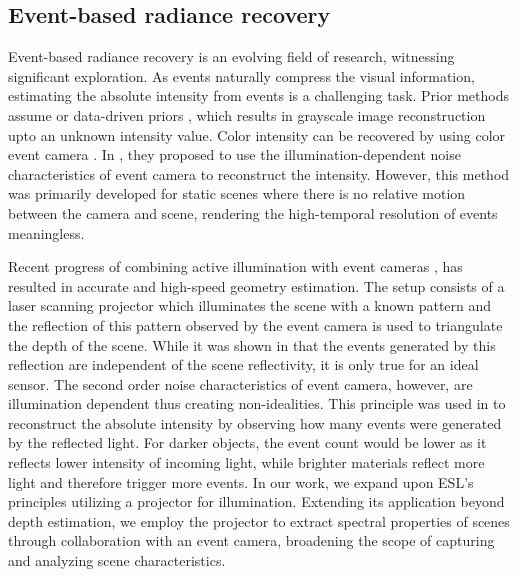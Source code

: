 \subsection{Event-based radiance recovery}
Event-based radiance recovery is an evolving field of research, witnessing significant exploration.
As events naturally compress the visual information, estimating the absolute intensity from events is a challenging task.
Prior methods assume \cite{} or data-driven priors \cite{Rebecq2018,}, which results in grayscale image reconstruction upto an unknown intensity value.
Color intensity can be recovered by using color event camera \cite{DAVIScolor, cedric_color}.
In \cite{Berkelyevent2noise}, they proposed to use the illumination-dependent noise characteristics of event camera to reconstruct the intensity.
However, this method was primarily developed for static scenes where there is no relative motion between the camera and scene, rendering the high-temporal resolution of events meaningless.

Recent progress of combining active illumination with event cameras \cite{Brandli13fns,Martel18icas, 
Matsuda15ICCP, ESL}, has resulted in accurate and high-speed geometry estimation.
The setup consists of a laser scanning projector which illuminates the scene with a known pattern and the reflection of this pattern observed by the event camera is used to triangulate the depth of the scene.
While it was shown in \cite{Matsuda15ICCP} that the events generated by this reflection are independent of the scene reflectivity, it is only true for an ideal sensor.
The second order noise characteristics of event camera, however, are illumination dependent thus creating non-idealities.
This principle was used in \cite{Ehsan2022} to reconstruct the absolute intensity by observing how many events were generated by the reflected light.
For darker objects, the event count would be lower as it reflects lower intensity of incoming light, while brighter materials reflect more light and therefore trigger more events.
In our work, we expand upon ESL's\cite{ESL} principles utilizing a projector for illumination. 
Extending its application beyond depth estimation, we employ the projector to extract spectral properties of scenes through collaboration with an event camera, broadening the scope of capturing and analyzing scene characteristics.

